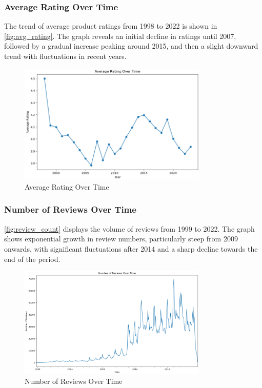 \documentclass{article}
\begin{document}
\subsubsection{Average Rating Over Time}

The trend of average product ratings from 1998 to 2022 is shown in
\autoref{fig:avg_rating}. The graph reveals an initial decline in ratings until
2007, followed by a gradual increase peaking around 2015, and then a slight
downward trend with fluctuations in recent years.
\begin{figure}[H]
      \centering
      \includegraphics[width=0.8\textwidth]{img/avg_rating_over_time.png}
      \caption{Average Rating Over Time}
      \label{fig:avg_rating}
\end{figure}

\subsubsection{Number of Reviews Over Time}

\autoref{fig:review_count} displays the volume of reviews from 1999 to 2022.
The graph shows exponential growth in review numbers, particularly steep from
2009 onwards, with significant fluctuations after 2014 and a sharp decline
towards the end of the period.
\begin{figure}[H]
      \centering
      \includegraphics[width=0.8\textwidth]{img/no_reviews_over_time.png}
      \caption{Number of Reviews Over Time}
      \label{fig:review_count}
\end{figure}
\end{document}
